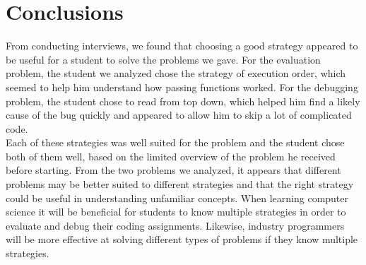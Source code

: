\section{Conclusions}
From conducting interviews, we found that choosing a good strategy appeared to be useful for a student to solve the problems we gave. 
For the evaluation problem, the student we analyzed chose the strategy of execution order, which seemed to help him understand how passing functions worked. 
For the debugging problem, the student chose to read from top down, which helped him find a likely cause of the bug quickly and appeared to allow him to skip a lot of complicated code.  \\

Each of these strategies was well suited for the problem and the student chose both of them well, based on the limited overview of the problem he received before starting. 
From the two problems we analyzed, it appears that different problems may be better suited to different strategies and that the right strategy could be useful in understanding unfamiliar concepts. 
When learning computer science it will be beneficial for students to know multiple strategies in order to evaluate and debug their coding assignments. Likewise, industry programmers will be more effective at solving different types of problems if they know multiple strategies. \\

